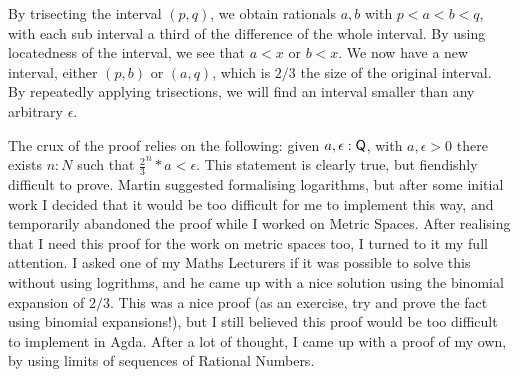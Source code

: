 \documentclass[ProjectReport]{subfiles}
\begin{document}
By trisecting the interval $(p,q)$, we obtain rationals $a,b$ with $p<a<b<q$, with each sub interval a third of the difference of the whole interval. By using locatedness of the interval, we see that $a < x$ or $b < x$. We now have a new interval, either $(p,b)$ or $(a,q)$, which is $2/3$ the size of the original interval. By repeatedly applying trisections, we will find an interval smaller than any arbitrary $\epsilon$. 


The crux of the proof relies on the following: given $a,\epsilon : \AgdaFunction{Q}$, with $a , \epsilon > 0$ there exists $n : N$ such that $\frac{2}{3}^n * a < \epsilon$. This statement is clearly true, but fiendishly difficult to prove. Martin suggested formalising logarithms, but after some initial work I decided that it would be too difficult for me to implement this way, and temporarily abandoned the proof while I worked on Metric Spaces. After realising that I need this proof for the work on metric spaces too, I turned to it my full attention. I asked one of my Maths Lecturers if it was possible to solve this without using logrithms, and he came up with a nice solution using the binomial expansion of $2/3$. This was a nice proof (as an exercise, try and prove the fact using binomial expansions!), but I still believed this proof would be too difficult to implement in Agda. After a lot of thought, I came up with a proof of my own, by using limits of sequences of Rational Numbers.
\end{document}

